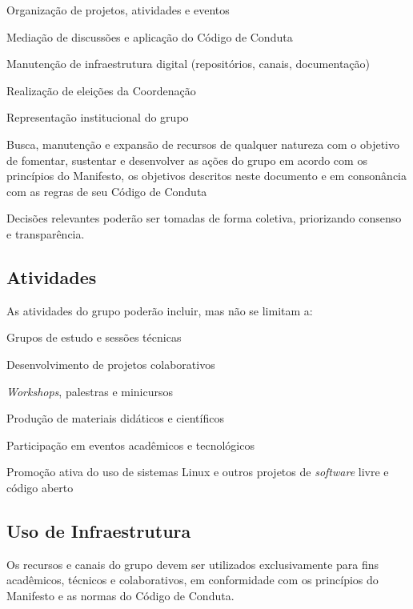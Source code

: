 \documentclass[
  12pt,          %
  a4paper,       %
  oneside,       %
  brazil         %
]{article}
\begin{document}
\begin{conduta}
  \item Organização de projetos, atividades e eventos
  \item Mediação de discussões e aplicação do Código de Conduta
  \item Manutenção de infraestrutura digital (repositórios, canais, documentação)
  \item Realização de eleições da Coordenação
  \item Representação institucional do grupo
  \item Busca, manutenção e expansão de recursos de qualquer natureza com o objetivo de fomentar, sustentar e desenvolver as ações do grupo 
  em acordo com os princípios do Manifesto, os objetivos descritos neste documento e em consonância com as regras de seu Código de Conduta
\end{conduta}

Decisões relevantes poderão ser tomadas de forma coletiva, priorizando consenso e transparência.

\subsection{Atividades}

As atividades do grupo poderão incluir, mas não se limitam a:

\begin{conduta}
  \item Grupos de estudo e sessões técnicas
  \item Desenvolvimento de projetos colaborativos
  \item \textit{Workshops}, palestras e minicursos
  \item Produção de materiais didáticos e científicos
  \item Participação em eventos acadêmicos e tecnológicos
  \item Promoção ativa do uso de sistemas Linux e outros projetos de \textit{software} livre e código aberto
\end{conduta}

\subsection{Uso de Infraestrutura}

Os recursos e canais do grupo devem ser utilizados exclusivamente para fins acadêmicos, técnicos e colaborativos, 
em conformidade com os princípios do Manifesto e as normas do Código de Conduta.
\end{document}
